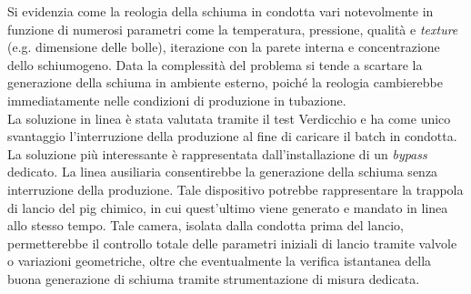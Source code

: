 Si evidenzia come la reologia della schiuma in condotta vari notevolmente in funzione di numerosi parametri come la temperatura, pressione, qualità e \textit{texture} (e.g. dimensione delle bolle), iterazione con la parete interna e concentrazione dello schiumogeno. Data la complessità del problema si tende a scartare la generazione della schiuma in ambiente esterno, poiché la reologia cambierebbe immediatamente nelle condizioni di produzione in tubazione.\\
La soluzione in linea è stata valutata tramite il test Verdicchio e ha come unico svantaggio l'interruzione della produzione al fine di caricare il batch in condotta.\\
La soluzione più interessante è rappresentata dall'installazione di un \textit{bypass} dedicato. La linea ausiliaria consentirebbe la generazione della schiuma senza interruzione della produzione. Tale dispositivo potrebbe rappresentare la trappola di lancio del pig chimico, in cui quest'ultimo viene generato e mandato in linea allo stesso tempo. Tale camera, isolata dalla condotta prima del lancio, permetterebbe il controllo totale delle parametri iniziali di lancio tramite valvole o variazioni geometriche, oltre che eventualmente la verifica istantanea della buona generazione di schiuma tramite strumentazione di misura dedicata.

\clearpage{\pagestyle{empty}\cleardoublepage}